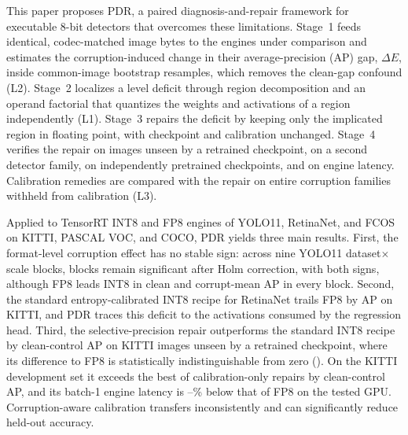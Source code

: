 \documentclass[a4paper,fleqn]{cas-dc}
\begin{document}
This paper proposes PDR, a paired diagnosis-and-repair framework for executable 8-bit detectors that overcomes these limitations. Stage~1 feeds identical, codec-matched image bytes to the engines under comparison and estimates the corruption-induced change in their average-precision (AP) gap, $\Delta E$, inside common-image bootstrap resamples, which removes the clean-gap confound (L2). Stage~2 localizes a level deficit through region decomposition and an operand factorial that quantizes the weights and activations of a region independently (L1). Stage~3 repairs the deficit by keeping only the implicated region in floating point, with checkpoint and calibration unchanged. Stage~4 verifies the repair on images unseen by a retrained checkpoint, on a second detector family, on independently pretrained checkpoints, and on engine latency. Calibration remedies are compared with the repair on entire corruption families withheld from calibration (L3).

Applied to TensorRT INT8 and FP8 engines of YOLO11, RetinaNet, and FCOS on KITTI, PASCAL VOC, and COCO, PDR yields three main results. First, the format-level corruption effect has no stable sign: across nine YOLO11 dataset$\times$scale blocks, \nnHolmSurvivorsWord{} blocks remain significant after Holm correction, with both signs, although FP8 leads INT8 in clean and corrupt-mean AP in every block. Second, the standard entropy-calibrated INT8 recipe for RetinaNet trails FP8 by \nnMatchedCleanDeficitKitti{} AP on KITTI, and PDR traces this deficit to the activations consumed by the regression head. Third, the selective-precision repair outperforms the standard INT8 recipe by \nnHvSelGainPt{} clean-control AP on KITTI images unseen by a retrained checkpoint, where its difference to FP8 is statistically indistinguishable from zero (\nnHvFinFeSelJ{}). On the KITTI development set it exceeds the best of \nnRepNCalibWord{} calibration-only repairs by \nnRepSelOverCalibJKitti{} clean-control AP, and its batch-1 engine latency is \nnLatSelVsFpEightMin--\nnLatSelVsFpEightMax\% below that of FP8 on the tested GPU. Corruption-aware calibration transfers inconsistently and can significantly reduce held-out accuracy.
\end{document}
